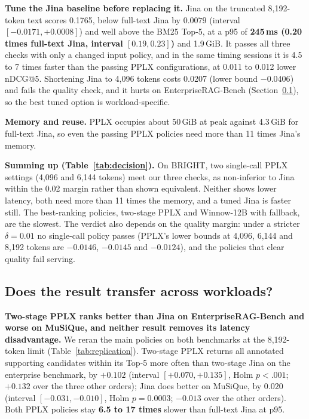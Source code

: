 \documentclass[conference]{IEEEtran}
\begin{document}
{\textbf{Tune the Jina baseline before replacing it.} Jina on the truncated 8,192-token text scores 0.1765, below full-text Jina by $0.0079$ (interval $[-0.0171,+0.0008]$) and well above the BM25 Top-5, at a p95 of \textbf{245\,ms (0.20 times full-text Jina, interval $[0.19,0.23]$)} and 1.9\,GiB. It passes all three checks with only a changed input policy, and in the same timing sessions it is 4.5 to 7 times faster than the passing PPLX configurations, at 0.011 to 0.012 lower nDCG@5. Shortening Jina to 4,096 tokens costs 0.0207 (lower bound $-0.0406$) and fails the quality check, and it hurts on EnterpriseRAG-Bench (Section~\ref{sec:overview}), so the best tuned option is workload-specific.

\textbf{Memory and reuse.} PPLX occupies about 50\,GiB at peak against 4.3\,GiB for full-text Jina, so even the passing PPLX policies need more than 11 times Jina's memory.

\textbf{Summing up (Table~\ref{tab:decision}).} On BRIGHT, two single-call PPLX settings (4,096 and 6,144 tokens) meet our three checks, as non-inferior to Jina within the 0.02 margin rather than shown equivalent. Neither shows lower latency, both need more than 11 times the memory, and a tuned Jina is faster still. The best-ranking policies, two-stage PPLX and Winnow-12B with fallback, are the slowest. The verdict also depends on the quality margin: under a stricter $\delta=0.01$ no single-call policy passes (PPLX's lower bounds at 4,096, 6,144 and 8,192 tokens are $-0.0146$, $-0.0145$ and $-0.0124$), and the policies that clear quality fail serving.



\subsection{Does the result transfer across workloads?}\label{sec:overview}
\textbf{Two-stage PPLX ranks better than Jina on EnterpriseRAG-Bench and worse on MuSiQue, and neither result removes its latency disadvantage.} We reran the main policies on both benchmarks at the 8,192-token limit (Table~\ref{tab:replication}). Two-stage PPLX returns all annotated supporting candidates within its Top-5 more often than two-stage Jina on the enterprise benchmark, by $+0.102$ (interval $[+0.070,+0.135]$, Holm $p<.001$; $+0.132$ over the three other orders); Jina does better on MuSiQue, by $0.020$ (interval $[-0.031,-0.010]$, Holm $p=0.0003$; $-0.013$ over the other orders). Both PPLX policies stay \textbf{6.5 to 17 times} slower than full-text Jina at p95.

}
\end{document}

